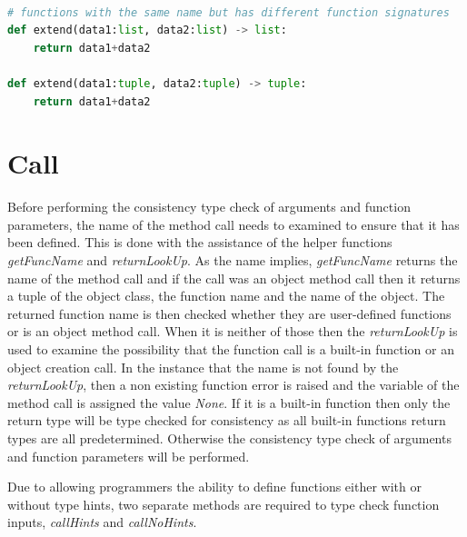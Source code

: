 \documentclass{l4proj}
\begin{document}
\begin{lstlisting}[language=Python, caption= Example of overloading functions (Polymorphism), label = {lst:poly}]

# functions with the same name but has different function signatures
def extend(data1:list, data2:list) -> list:
    return data1+data2
    
def extend(data1:tuple, data2:tuple) -> tuple:
    return data1+data2
\end{lstlisting}

\section{Call}
Before performing the consistency type check of arguments and function parameters, the name of the method call needs to examined to ensure that it has been defined. This is done with the assistance of the helper functions \textit{getFuncName} and \textit{returnLookUp}. As the name implies, \textit{getFuncName} returns the name of the method call and if the call was an object method call then it returns a tuple of the object class, the function name and the name of the object. The returned function name is then checked whether they are user-defined functions or is an object method call. When it is neither of those then the \textit{returnLookUp} is used to examine the possibility that the function call is a built-in function or an object creation call. In the instance that the name is not found by the \textit{returnLookUp}, then a non existing function error is raised and the variable of the method call is assigned the value \textit{None}. If it is a built-in function then only the return type will be type checked for consistency as all built-in functions return types are all predetermined. Otherwise the consistency type check of arguments and function parameters will be performed.

Due to allowing programmers the ability to define functions either with or without type hints, two separate methods are required to type check function inputs, \textit{callHints} and \textit{callNoHints}.
\end{document}
